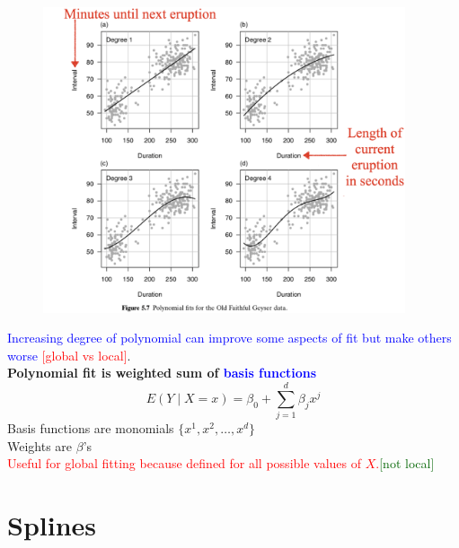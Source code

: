 \documentclass[14pt]{extarticle}
\begin{document}
\begin{figure}[H]
    \centering
    \includegraphics[width=0.95\textwidth]{fig32.png}
\end{figure}
\noindent
\textcolor{blue}{Increasing degree of polynomial can improve some aspects of fit but make others worse} \textcolor{red}{[global vs local]}.\\
\textbf{Polynomial fit is weighted sum of \textcolor{blue}{basis functions}}
\[ E(Y\mid X=x) = \beta_0 + \sum_{j=1}^{d} \beta_j x^j \]
Basis functions are monomials $\{x^1, x^2, \ldots, x^d\}$\\
Weights are $\beta$'s\\
\textcolor{red}{Useful for global fitting because defined for all possible values of $X$.}\textcolor{darkgreen}{[not local]}

\section*{Splines}
\end{document}
